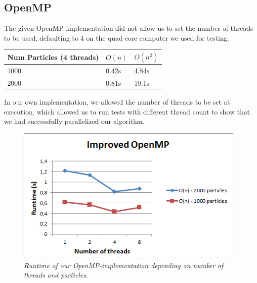 \documentclass[11pt,a4paper]{article}
\begin{document}
\subsection{OpenMP}
The given OpenMP implementation did not allow us to set the number of threads to be used, defaulting to 4 on the quad-core computer we used for testing.
\begin{center}
    \begin{tabular}{ | l | l | l |}
    \hline
    Num Particles (4 threads) & $O(n)$ & $O(n^{2})$  \\ \hline
    1000 & 0.42s & 4.84s  \\ \hline
    2000 & 0.81s & 19.1s \\
    \hline
    \end{tabular}
\end{center}
In our own implementation, we allowed the number of threads to be set at execution, which allowed us to run tests with different thread count to show that we had successfully parallelized our algorithm.
\begin{figure}[h!]
\centering
\includegraphics[scale=0.8]{pics/open1.png}
\caption{\emph{Runtime of our OpenMP-implementation depending on number of threads and particles}.}
\label{fig:gird}
\end{figure}
\newpage
\end{document}
